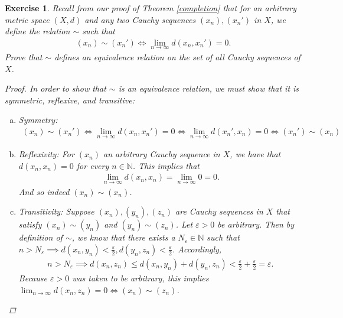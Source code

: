 \documentclass[11pt]{article}
\theoremstyle{mystyle}
\newtheorem{protoexer}{Exercise}[section]
\newenvironment{exer}
{\colorlet{shadecolor}{blue!15}\begin{shaded}\begin{protoexer}}
{\end{protoexer}\end{shaded}}
\begin{document}
\begin{exer}
Recall from our proof of Theorem \ref{completion} that for an arbitrary metric space $(X,d)$ and any two Cauchy sequences $(x_n), (x_n')$ in $X$, we define the relation $\sim$ such that
\begin{align*}
 (x_n) \sim (x_n') \iff \lim_{n \longrightarrow \infty} d(x_n, x_n') = 0.   
\end{align*}
Prove that $\sim$ defines an equivalence relation on the set of all Cauchy sequences of $X$.
\begin{proof}
In order to show that $\sim$ is an equivalence relation, we must show that it is symmetric, reflexive, and transitive:
\begin{enumerate}[(a)]
    \item Symmetry:
    \begin{align*}
    (x_n) \sim (x_n') \iff \lim_{n \longrightarrow \infty} d(x_n, x_n') = 0 \iff \lim_{n \longrightarrow \infty} d(x_n', x_n) = 0 \iff (x_n') \sim (x_n)
    \end{align*}
    \item Reflexivity:
    For $(x_n)$ an arbitrary Cauchy sequence in $X$, we have that $d(x_n, x_n) = 0$ for every $n \in \mathbb{N}$. This implies that
    \begin{align*}
        \lim_{n \longrightarrow \infty} d(x_n, x_n) = \lim_{n \longrightarrow \infty} 0 = 0. 
    \end{align*}
    And so indeed $(x_n) \sim (x_n)$.
    \item Transitivity: Suppose $(x_n), (y_n), (z_n)$ are Cauchy sequences in $X$ that satisfy $(x_n) \sim (y_n)$ and $(y_n) \sim (z_n)$. Let $\varepsilon > 0$ be arbitrary. Then by definition of $\sim$, we know that there exists a $N_{\varepsilon} \in \mathbb{N}$ such that $n > N_{\varepsilon} \implies d(x_n, y_n) < \frac{\varepsilon}{2}, d(y_n, z_n) < \frac{\varepsilon}{2}$. Accordingly,
    \begin{align*}
        n > N_{\varepsilon} \implies d(x_n, z_n) \leq d(x_n, y_n) + d(y_n, z_n) < \frac{\varepsilon}{2} + \frac{\varepsilon}{2} = \varepsilon.
    \end{align*}
    Because $\varepsilon > 0$ was taken to be arbitrary, this implies $\lim_{n \to \infty} d(x_n, z_n) = 0 \iff (x_n) \sim (z_n)$.
\end{enumerate}
\end{proof}
\end{exer}
\end{document}
